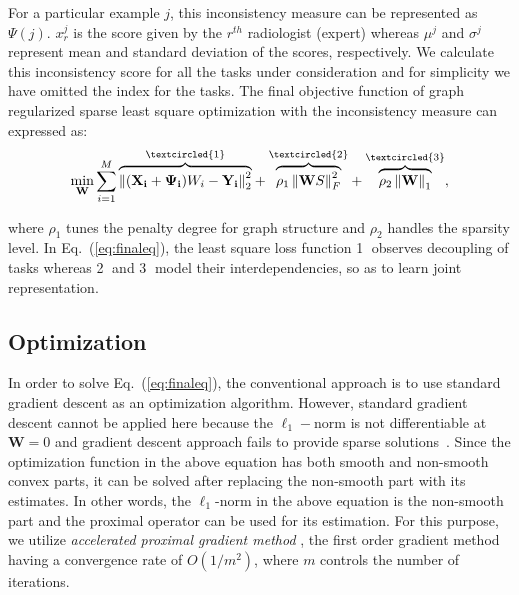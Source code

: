 \documentclass[journal]{IEEEtran}
\DeclareMathOperator*{\minimum}{min}
\begin{document}
For a particular example $j$, this inconsistency measure can be represented as $\Psi(j)$. $x_r^j$ is the score given by the $r^{th}$ radiologist (expert) whereas $\mu^j$ and $\sigma^j$ represent mean and standard deviation of the scores, respectively. We calculate this inconsistency score for all the tasks under consideration and for simplicity we have omitted the index for the tasks. The final objective function of graph regularized sparse least square optimization with the inconsistency measure can expressed as:
\begin{equation}
\minimum_{\mathbf{W}}\sum_{i=1}^{M}\overset{{\textcircled{1}}}{\overbrace{\left \|(\mathbf{X_i}+\mathbf{\Psi_i})W_i-\mathbf{Y_i}  \right \|_{2}^{2}}}+\overset{{\textcircled{2}}}{\overbrace{\rho_1\left \| \mathbf{W}S \right \|_{F}^{2}}}+\overset{{\textcircled{3}}}{\overbrace{\rho_2\left \| \mathbf{W} \right \|_{1}}},
\label{eq:finaleq}
\end{equation}


\noindent where $\rho_1$ tunes the penalty degree for graph structure and $\rho_2$ handles the sparsity level. In Eq.~(\ref{eq:finaleq}), the least square loss function \textcircled{1} observes decoupling of tasks whereas \textcircled{2} and \textcircled{3} model their interdependencies, so as to learn joint representation.

\subsection{Optimization}
In order to solve Eq.~(\ref{eq:finaleq}), the conventional approach is to use standard gradient descent as an optimization algorithm. However, standard gradient descent cannot be applied here because the $\ell_1-$norm is not differentiable at $\mathbf{W}=0$ and gradient descent approach fails to provide sparse solutions~\cite{shalev2011stochastic}. Since the optimization function in the above equation has both smooth and non-smooth convex parts, it can be solved after replacing the non-smooth part with its estimates. In other words, the $\ell_1$-norm in the above equation is the non-smooth part and the proximal operator can be used for its estimation. For this purpose, we utilize \emph{accelerated proximal gradient method} \cite{nesterov2013introductory}, the first order gradient method having a convergence rate of $O(1/m^2)$, where $m$ controls the number of iterations. %
\end{document}
